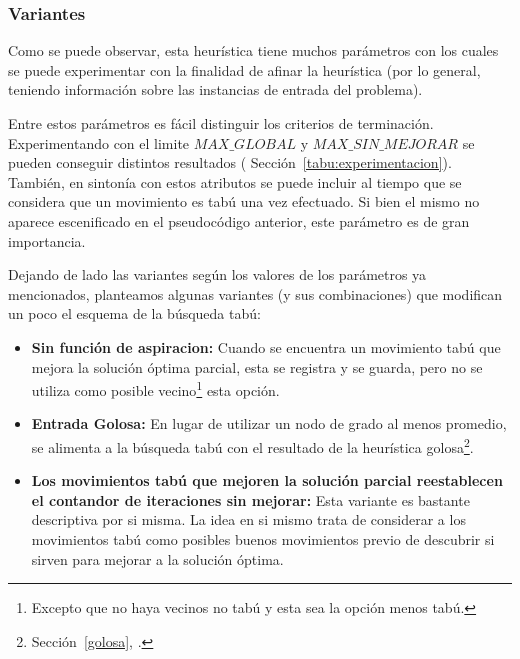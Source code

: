 \bigskip

\subsubsection{Variantes\label{tabu:variantes}}
\par Como se puede observar, esta heur\'istica tiene muchos par\'ametros
    con los cuales se puede experimentar con la finalidad de afinar
    la heur\'istica (por lo general, teniendo informaci\'on sobre las
    instancias de entrada del problema).

\par Entre estos par\'ametros es f\'acil distinguir los criterios
    de terminaci\'on. Experimentando con el limite $MAX\_GLOBAL$ y
    $MAX\_SIN\_MEJORAR$ se pueden conseguir distintos resultados (%
    Secci\'on~\ref{tabu:experimentacion}). Tambi\'en, en sinton\'ia
    con estos atributos se puede incluir al tiempo que se considera
    que un movimiento es tab\'u una vez efectuado. Si bien el mismo
    no aparece escenificado en el pseudoc\'odigo anterior, este
    par\'ametro es de gran importancia.

\par Dejando de lado las variantes seg\'un los valores de los
    par\'ametros ya mencionados, planteamos algunas variantes (y
    sus combinaciones) que modifican un poco el esquema de la
    b\'usqueda tab\'u:

\begin{itemize}
    \item \textbf{Sin funci\'on de aspiracion: } Cuando se encuentra
        un movimiento tab\'u que mejora la soluci\'on \'optima
        parcial, esta se registra y se guarda, pero no se utiliza
        como posible vecino\footnote{Excepto que no haya vecinos no tab\'u
        y esta sea la opci\'on menos tab\'u.} esta opci\'on.

    \item \textbf{Entrada Golosa: } En lugar de utilizar un nodo de grado
        al menos promedio, se alimenta a la b\'usqueda tab\'u con el resultado
        de la heur\'istica golosa\footnote{Secci\'on~\ref{golosa},
        \emph{}.}.

    \item \textbf{Los movimientos tab\'u que mejoren la soluci\'on parcial
        reestablecen el contandor de iteraciones sin mejorar: } Esta variante
        es bastante descriptiva por si misma. La idea en si mismo trata
        de considerar a los movimientos tab\'u como posibles buenos movimientos
        previo de descubrir si sirven para mejorar a la soluci\'on \'optima.
\end{itemize}
